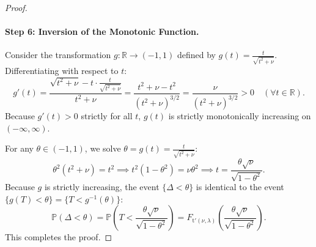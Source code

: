 \begin{proof}
\paragraph{Step 6: Inversion of the Monotonic Function.}
Consider the transformation $g: \mathbb{R} \to (-1, 1)$ defined by $g(t) = \frac{t}{\sqrt{t^2 + \nu}}$. Differentiating with respect to $t$:
\begin{equation}
g'(t) = \frac{\sqrt{t^2 + \nu} - t \cdot \frac{t}{\sqrt{t^2 + \nu}}}{t^2 + \nu} = \frac{t^2 + \nu - t^2}{(t^2 + \nu)^{3/2}} = \frac{\nu}{(t^2 + \nu)^{3/2}} > 0 \quad (\forall t \in \mathbb{R}).
\end{equation}
Because $g'(t) > 0$ strictly for all $t$, $g(t)$ is strictly monotonically increasing on $(-\infty, \infty)$. 

For any $\theta \in (-1, 1)$, we solve $\theta = g(t) = \frac{t}{\sqrt{t^2 + \nu}}$:
\begin{equation}
\theta^2 (t^2 + \nu) = t^2 \implies t^2(1 - \theta^2) = \nu \theta^2 \implies t = \frac{\theta \sqrt{\nu}}{\sqrt{1 - \theta^2}}.
\end{equation}
Because $g$ is strictly increasing, the event $\{\Delta < \theta\}$ is identical to the event $\{g(T) < \theta\} = \{T < g^{-1}(\theta)\}$:
\begin{equation}
\mathbb{P}(\Delta < \theta) = \mathbb{P}\left( T < \frac{\theta \sqrt{\nu}}{\sqrt{1 - \theta^2}} \right) = F_{\mathrm{t}'(\nu, \lambda)}\left( \frac{\theta \sqrt{\nu}}{\sqrt{1 - \theta^2}} \right).
\end{equation}
This completes the proof.
\end{proof}
